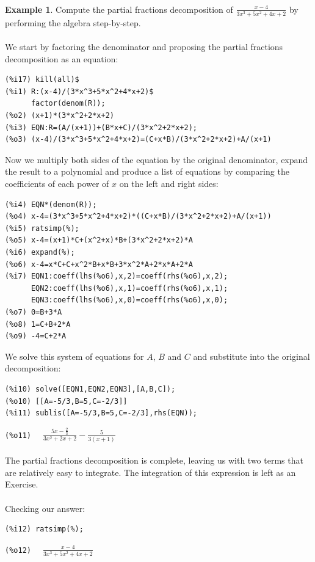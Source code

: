 \documentclass[10.5pt,twoside]{report}
\theoremstyle{definition}
\newtheorem{exmp}{Example}[section]
\begin{document}
${}$\\
\begin{exmp} Compute the partial fractions decomposition of $\frac{x-4}{3x^3+5x^2+4x+2}$ by performing the algebra step-by-step.\\
${}$\\
We start by factoring the denominator and proposing the partial fractions decomposition as an equation:

\begin{verbatim}
(%i17) kill(all)$
(%i1) R:(x-4)/(3*x^3+5*x^2+4*x+2)$
      factor(denom(R));
(%o2) (x+1)*(3*x^2+2*x+2)
(%i3) EQN:R=(A/(x+1))+(B*x+C)/(3*x^2+2*x+2);
(%o3) (x-4)/(3*x^3+5*x^2+4*x+2)=(C+x*B)/(3*x^2+2*x+2)+A/(x+1)
\end{verbatim}

Now we multiply both sides of the equation by the original denominator, expand the result to a polynomial and produce a list of equations by comparing the coefficients of each power of $x$ on the left and right sides:

\begin{verbatim}
(%i4) EQN*(denom(R));
(%o4) x-4=(3*x^3+5*x^2+4*x+2)*((C+x*B)/(3*x^2+2*x+2)+A/(x+1))
(%i5) ratsimp(%);
(%o5) x-4=(x+1)*C+(x^2+x)*B+(3*x^2+2*x+2)*A
(%i6) expand(%);
(%o6) x-4=x*C+C+x^2*B+x*B+3*x^2*A+2*x*A+2*A
(%i7) EQN1:coeff(lhs(%o6),x,2)=coeff(rhs(%o6),x,2);
      EQN2:coeff(lhs(%o6),x,1)=coeff(rhs(%o6),x,1);
      EQN3:coeff(lhs(%o6),x,0)=coeff(rhs(%o6),x,0);
(%o7) 0=B+3*A
(%o8) 1=C+B+2*A
(%o9) -4=C+2*A
\end{verbatim}

We solve this system of equations for $A$, $B$ and $C$ and substitute into the original decomposition:

\begin{verbatim}
(%i10) solve([EQN1,EQN2,EQN3],[A,B,C]);
(%o10) [[A=-5/3,B=5,C=-2/3]]
(%i11) sublis([A=-5/3,B=5,C=-2/3],rhs(EQN));
\end{verbatim}
\verb|(%o11)  | $\frac{5x-\frac{2}{3}}{3x^2+2x+2}-\frac{5}{3(x+1)}$\\
${}$\\


The partial fractions decomposition is complete, leaving us with two terms that are relatively easy to integrate.  The integration of this expression is left as an Exercise.\\

${}$\\


Checking our answer:\\

\begin{verbatim}
(%i12) ratsimp(%);
\end{verbatim}
\verb|(%o12)  | $\frac{x-4}{3x^3+5x^2+4x+2}$






\end{exmp}
\end{document}
